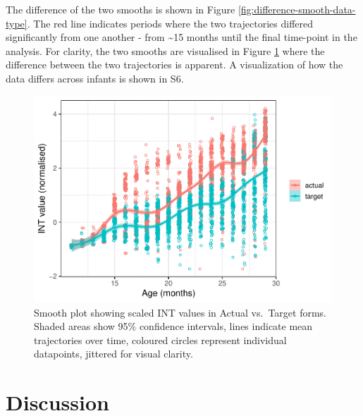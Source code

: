 \documentclass[
  man]{apa6}
\begin{document}
The difference of the two smooths is shown in Figure \ref{fig:difference-smooth-data-type}. The red line indicates periods where the two trajectories differed significantly from one another - from \textasciitilde15 months until the final time-point in the analysis. For clarity, the two smooths are visualised in Figure \ref{fig:plotted-smooth-data-type} where the difference between the two trajectories is apparent. A visualization of how the data differs across infants is shown in S6.

\begin{figure}
\centering
\includegraphics{PhonNetworksProj-revised_files/figure-latex/plotted-smooth-data-type-1.pdf}
\caption{\label{fig:plotted-smooth-data-type}Smooth plot showing scaled INT values in Actual vs.~Target forms. Shaded areas show 95\% confidence intervals, lines indicate mean trajectories over time, coloured circles represent individual datapoints, jittered for visual clarity.}
\end{figure}

\hypertarget{discussion}{%
\section{Discussion}\label{discussion}}
\end{document}

